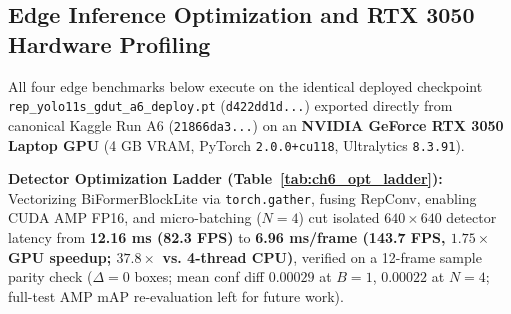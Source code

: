 \subsection{Edge Inference Optimization and RTX 3050 Hardware Profiling}

All four edge benchmarks below execute on the identical deployed checkpoint \nolinkurl{rep_yolo11s_gdut_a6_deploy.pt} (\texttt{d422dd1d...}) exported directly from canonical Kaggle Run A6 (\texttt{21866da3...}) on an \textbf{NVIDIA GeForce RTX 3050 Laptop GPU} (4 GB VRAM, PyTorch \texttt{2.0.0+cu118}, Ultralytics \texttt{8.3.91}).

\noindent\textbf{Detector Optimization Ladder (Table~\ref{tab:ch6_opt_ladder}):} Vectorizing BiFormerBlockLite via \texttt{torch.gather}, fusing RepConv, enabling CUDA AMP FP16, and micro-batching ($N=4$) cut isolated $640 \times 640$ detector latency from \textbf{12.16 ms (82.3 FPS)} to \textbf{6.96 ms/frame (143.7 FPS, $1.75\times$ GPU speedup; $37.8\times$ vs. 4-thread CPU)}, verified on a 12-frame sample parity check ($\Delta = 0$ boxes; mean conf diff $0.00029$ at $B=1$, $0.00022$ at $N=4$; full-test AMP mAP re-evaluation left for future work).

\begin{table}[htbp]
\centering
\caption{Before vs. After Detector-Only Inference Optimization on Canonical Rep-YOLO11s-GDUT-A6 (\texttt{21866da3 $\to$ d422dd1d}, RTX 3050, $640 \times 640$).}
\label{tab:ch6_opt_ladder}
\end{table}


